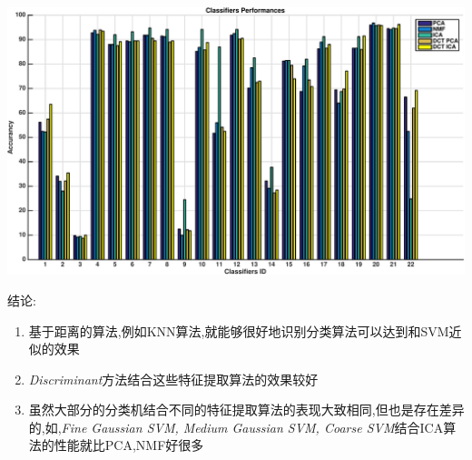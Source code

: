 	\begin{center}
	\begin{minipage}[t]{\linewidth}
	\center
	{
	\includegraphics[width=\textwidth]{Img/pni_res} 
	}
	\end{minipage}
	\medskip
	\end{center}
	
结论:
\begin{enumerate}
	\item 基于距离的算法,例如KNN算法,就能够很好地识别分类算法可以达到和SVM近似的效果
	\item \textit{Discriminant}方法结合这些特征提取算法的效果较好
	\item 虽然大部分的分类机结合不同的特征提取算法的表现大致相同,但也是存在差异的,如,\textit{Fine Gaussian SVM, Medium Gaussian SVM, Coarse SVM}结合ICA算法的性能就比PCA,NMF好很多
\end{enumerate}

	

	